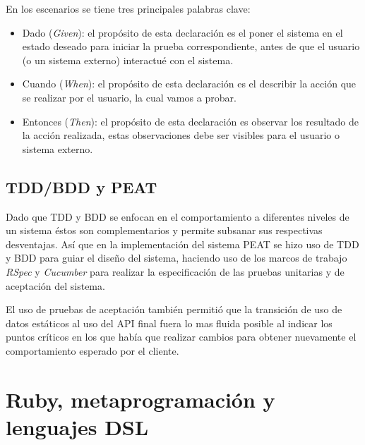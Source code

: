 \vspace{2.5mm}

En los escenarios se tiene tres principales palabras clave:
\begin{itemize}
\item Dado (\textit{Given}): el propósito de esta declaración es el poner
  el sistema en el estado deseado para iniciar la prueba correspondiente,
  antes de que el usuario (o un sistema externo) interactué con el sistema.
\item Cuando (\textit{When}): el propósito de esta declaración es el describir
  la acción que se realizar por el usuario, la cual vamos a probar.
\item Entonces (\textit{Then}): el propósito de esta declaración es observar
  los resultado de la acción realizada, estas observaciones debe ser visibles
  para el usuario o sistema externo.
\end{itemize}

\subsection{TDD/BDD y PEAT}
Dado que TDD y BDD se enfocan en el comportamiento a diferentes niveles
de un sistema éstos son complementarios y permite subsanar sus respectivas
desventajas. Así que en la implementación del sistema PEAT se hizo uso de
TDD y BDD para guiar el diseño del sistema, haciendo uso de los marcos
de trabajo \textit{RSpec} y \textit{Cucumber} para realizar la especificación
de las pruebas unitarias y de aceptación del sistema.

El uso de pruebas de aceptación también permitió que la transición de uso de datos
estáticos al uso del API final fuera lo mas fluida posible al indicar
los puntos críticos en los que había que realizar cambios para obtener nuevamente
el comportamiento esperado por el cliente.


\section{Ruby, metaprogramación y lenguajes DSL}
